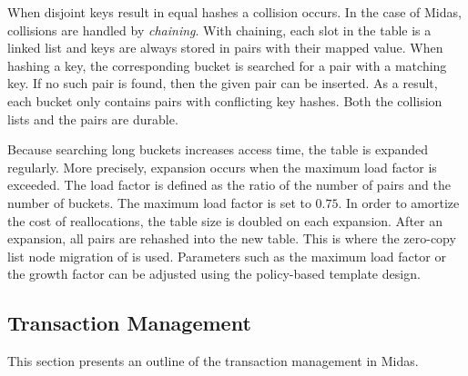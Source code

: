 When disjoint keys result in equal hashes a collision occurs. In the case of
Midas, collisions are handled by \emph{chaining}. With chaining, each slot in
the table is a linked list and keys are always stored in pairs with their mapped
value. When hashing a key, the corresponding bucket is searched for a pair with
a matching key. If no such pair is found, then the given pair can be inserted.
As a result, each bucket only contains pairs with conflicting key hashes. Both
the collision lists and the pairs are durable.

Because searching long buckets increases access time, the table is expanded
regularly. More precisely, expansion occurs when the maximum load factor is
exceeded. The load factor is defined as the ratio of the number of pairs and the
number of buckets. The maximum load factor is set to $0.75$. In order to
amortize the cost of reallocations, the table size is doubled on each expansion.
After an expansion, all pairs are rehashed into the new table. This is where the
zero-copy list node migration of  is used. Parameters such as the
maximum load factor or the growth factor can be adjusted using the policy-based
template design.




\newpage

\subsection{Transaction Management}
\label{ch:impl-mvcc}

This section presents an outline of the transaction management in Midas.

